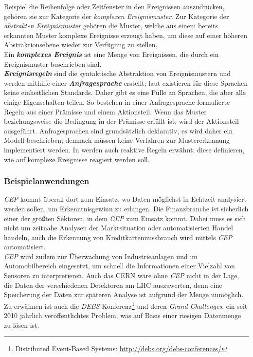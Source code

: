 \documentclass{acm_proc_article-sp}
\begin{document}
Beispiel die Reihenfolge oder Zeitfenster in den Ereignissen auszudrücken, 
gehören sie zur Kategorie der \textit{komplexen Ereignismuster}. Zur Kategorie der 
\textit{abstrakten Ereignismuster} gehören die Muster, welche aus einem bereits erkannten 
Muster komplexe Ereignisse erzeugt haben, um diese auf einer höheren Abstraktionsebene 
wieder 
zur Verfügung zu stellen.\\
Ein \textbf{\textit{komplexes Ereignis}} ist eine Menge von Ereignissen, die durch ein 
Ereignismuster beschrieben 
sind.\\\label{begriff-ereignisregel}\textbf{\textit{Ereignisregeln}} sind die 
syntaktische Abstraktion von Ereignismustern 
und werden mithilfe einer \textbf{\textit{Anfragesprache}} erstellt; laut \cite{bruns} 
existieren für diese 
Sprachen keine einheitlichen Standards. Daher gibt es eine Fülle an Sprachen, die aber 
alle einige Eigenschaften teilen. So bestehen in einer Anfragesprache formulierte 
Regeln aus einer Prämisse und einem Aktionsteil. Wenn das Muster beziehungsweise die 
Bedingung in der Prämisse erfüllt ist, wird der Aktionsteil ausgeführt. Anfragesprachen 
sind grundsätzlich deklarativ, es wird daher ein Modell beschrieben; demnach müssen keine 
Verfahren zur Mustererkennung implementiert werden. In \cite{eckert} werden auch reaktive 
Regeln erwähnt; 
diese definieren, wie auf komplexe Ereignisse reagiert werden soll.

\subsubsection{Beispielanwendungen}
\vspace{0.1cm}

\textit{CEP} kommt überall dort zum Einsatz, wo Daten möglichst in Echtzeit analysiert 
werden sollen, um Erkenntnisgewinn zu erlangen. Die Finanzbranche ist sicherlich einer 
der 
größten Sektoren, in dem \textit{CEP} zum Einsatz kommt. Dabei muss es sich nicht um 
zeitnahe Analysen der Marktsituation oder automatisierten Handel handeln, auch die 
Erkennung von 
Kreditkartenmissbrauch wird mittels \textit{CEP} automatisiert.\\
\textit{CEP} wird zudem 
zur Überwachung von Industrieanlagen und im Automobilbereich eingesetzt, um schnell die 
Informationen einer Vielzahl von Sensoren zu interpretieren. Auch das CERN wäre ohne 
\textit{CEP} nicht in der Lage, die Daten der verschiedenen Detektoren am LHC 
auszuwerten, 
denn eine Speicherung der Daten zur späteren Analyse ist aufgrund der Menge unmöglich.\\
Zu erwähnen ist auch die \textit{DEBS}-Konferenz\footnote{Distributed Event-Based 
Systems: 
\url{http://debs.org/debs-conferences/}} und deren \textit{Grand Challenges}, ein seit 
2010 jährlich veröffentlichtes Problem, was auf Basis einer riesigen Datenmenge zu lösen 
ist.
\end{document}
